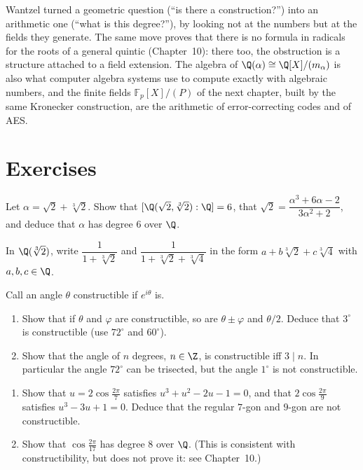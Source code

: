 \begin{beauty}
Wantzel turned a geometric question (``is there a construction?'') into an arithmetic one (``what is this degree?''), by looking not at the numbers but at the fields they generate. The same move proves that there is no formula in radicals for the roots of a general quintic (Chapter~10): there too, the obstruction is a structure attached to a field extension. The algebra of $\Q(\alpha)\cong\Q[X]/(m_\alpha)$ is also what computer algebra systems use to compute exactly with algebraic numbers, and the finite fields $\mathbb F_p[X]/(P)$ of the next chapter, built by the same Kronecker construction, are the arithmetic of error-correcting codes and of AES.
\end{beauty}

\section{Exercises}

\begin{exercise}[$\star$]\label{ex:sqrt23}
Let $\alpha=\sqrt2+\sqrt[3]2$. Show that $[\Q(\sqrt2,\sqrt[3]2):\Q]=6$, that $\sqrt2=\dfrac{\alpha^3+6\alpha-2}{3\alpha^2+2}$, and deduce that $\alpha$ has degree $6$ over $\Q$.
\end{exercise}

\begin{exercise}[$\star$]\label{ex:inverse}
In $\Q(\sqrt[3]2)$, write $\dfrac1{1+\sqrt[3]2}$ and $\dfrac1{1+\sqrt[3]2+\sqrt[3]4}$ in the form $a+b\sqrt[3]2+c\sqrt[3]4$ with $a,b,c\in\Q$.
\end{exercise}

\begin{exercise}[$\star\star$]\label{ex:classical}
Call an angle $\theta$ constructible if $e^{i\theta}$ is.
\begin{enumerate}[label=(\alph*)]
\item Show that if $\theta$ and $\varphi$ are constructible, so are $\theta\pm\varphi$ and $\theta/2$. Deduce that $3^\circ$ is constructible (use $72^\circ$ and $60^\circ$).
\item Show that the angle of $n$ degrees, $n\in\Z$, is constructible iff $3\mid n$. In particular the angle $72^\circ$ can be trisected, but the angle $1^\circ$ is not constructible.
\end{enumerate}
\end{exercise}

\begin{exercise}[$\star\star$]\label{ex:polygons}
\begin{enumerate}[label=(\alph*)]
\item Show that $u=2\cos\frac{2\pi}7$ satisfies $u^3+u^2-2u-1=0$, and that $2\cos\frac{2\pi}9$ satisfies $u^3-3u+1=0$. Deduce that the regular $7$-gon and $9$-gon are not constructible.
\item Show that $\cos\frac{2\pi}{17}$ has degree $8$ over $\Q$. (This is consistent with constructibility, but does not prove it: see Chapter~10.)
\end{enumerate}
\end{exercise}

